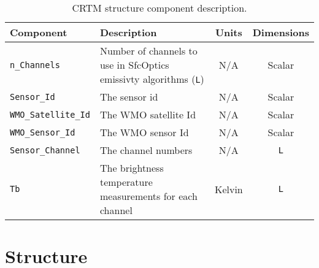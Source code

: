 \begin{table}[htp]
  \centering
  \begin{tabular}{l p{7cm} c c}
    \hline
    \sffamily\textbf{Component} & \sffamily\textbf{Description} & \sffamily\textbf{Units} & \sffamily\textbf{Dimensions} \\
    \hline\hline
    \texttt{n\_Channels}        & Number of channels to use in SfcOptics emissivty algorithms (\texttt{L}) & N/A    & Scalar \\
    \texttt{Sensor\_Id}         & The sensor id                                                            & N/A    & Scalar \\
    \texttt{WMO\_Satellite\_Id} & The WMO satellite Id                                                     & N/A    & Scalar \\
    \texttt{WMO\_Sensor\_Id}    & The WMO sensor Id                                                        & N/A    & Scalar \\
    \texttt{Sensor\_Channel}    & The channel numbers                                                      & N/A    & \texttt{L} \\
    \texttt{Tb}                 & The brightness temperature measurements for each channel                 & Kelvin & \texttt{L} \\
    \hline
  \end{tabular}
  \caption{CRTM \SensorData{} structure component description.}
  \label{tab:sensordata_structure}
\end{table}

\clearpage














\clearpage
\section{\Geometry{} Structure}
\label{sec:geometry_structure}


